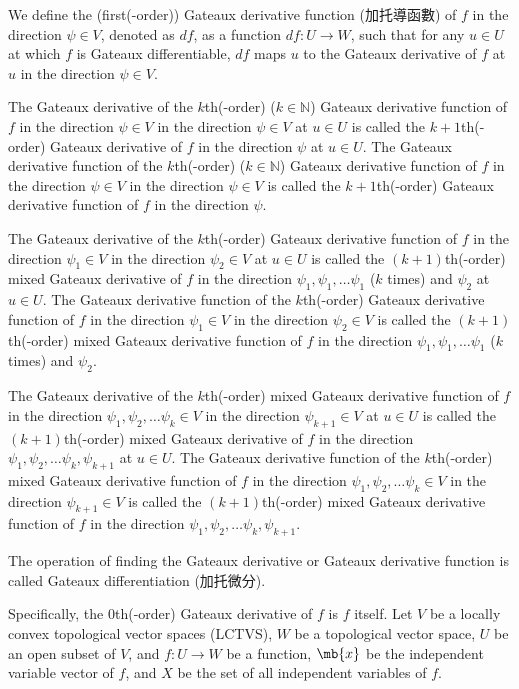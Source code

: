 \documentclass[a4paper,12pt]{report}
\begin{document}
We define the (first(-order)) Gateaux derivative function (加托導函數) of $f$ in the direction $\psi \in V$, denoted as $df$, as a function $df\colon U\to W$, such that for any $u\in U$ at which $f$ is Gateaux differentiable, $df$ maps $u$ to the Gateaux derivative of $f$ at $u$ in the direction $\psi \in V$.

The Gateaux derivative of the $k$th(-order) ($k\in\mathbb{N}$) Gateaux derivative function of $f$ in the direction $\psi \in V$ in the direction $\psi \in V$ at $u\in U$ is called the $k+1$th(-order) Gateaux derivative of $f$ in the direction $\psi$ at $u\in U$. The Gateaux derivative function of the $k$th(-order) ($k\in\mathbb{N}$) Gateaux derivative function of $f$ in the direction $\psi \in V$ in the direction $\psi \in V$ is called the $k+1$th(-order) Gateaux derivative function of $f$ in the direction $\psi$.

The Gateaux derivative of the $k$th(-order) Gateaux derivative function of $f$ in the direction $\psi_1\in V$ in the direction $\psi_2\in V$ at $u\in U$ is called the $(k+1)$th(-order) mixed Gateaux derivative of $f$ in the direction $\psi_1,\psi_1,\ldots\psi_1$ ($k$ times) and $\psi_2$ at $u\in U$. The Gateaux derivative function of the $k$th(-order) Gateaux derivative function of $f$ in the direction $\psi_1\in V$ in the direction $\psi_2\in V$ is called the $(k+1)$th(-order) mixed Gateaux derivative function of $f$ in the direction $\psi_1,\psi_1,\ldots\psi_1$ ($k$ times) and $\psi_2$.

The Gateaux derivative of the $k$th(-order) mixed Gateaux derivative function of $f$ in the direction $\psi_1,\psi_2,\ldots\psi_k\in V$ in the direction $\psi_{k+1}\in V$ at $u\in U$ is called the $(k+1)$th(-order) mixed Gateaux derivative of $f$ in the direction $\psi_1,\psi_2,\ldots\psi_k,\psi_{k+1}$ at $u\in U$. The Gateaux derivative function of the $k$th(-order) mixed Gateaux derivative function of $f$ in the direction $\psi_1,\psi_2,\ldots\psi_k\in V$ in the direction $\psi_{k+1}\in V$ is called the $(k+1)$th(-order) mixed Gateaux derivative function of $f$ in the direction $\psi_1,\psi_2,\ldots\psi_k,\psi_{k+1}$.

The operation of finding the Gateaux derivative or Gateaux derivative function is called Gateaux differentiation (加托微分).

Specifically, the $0$th(-order) Gateaux derivative of $f$ is $f$ itself.
Let $V$ be a locally convex topological vector spaces (LCTVS), $W$ be a topological vector space, $U$ be an open subset of $V$, and $f\colon U\to W$ be a function, $\mb{x}$ be the independent variable vector of $f$, and $X$ be the set of all independent variables of $f$.
\end{document}
